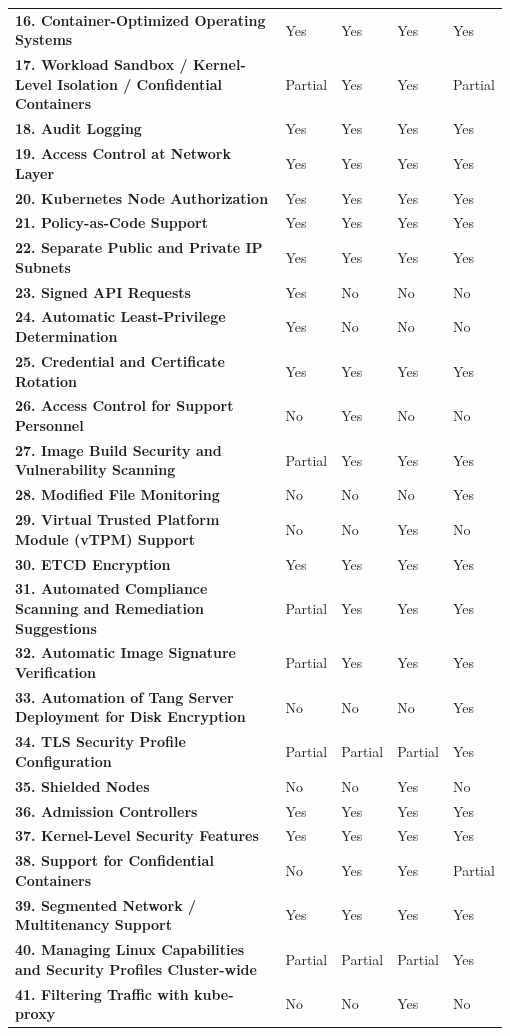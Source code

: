 \begin{longtable}{p{0.74\linewidth} p{0.06\linewidth} p{0.06\linewidth} p{0.06\linewidth} p{0.06\linewidth}}
\textbf{16. Container-Optimized Operating Systems} & Yes & Yes & Yes &
Yes \\
\textbf{17. Workload Sandbox / Kernel-Level Isolation / Confidential
Containers} & \small{Partial} & Yes & Yes & \small{Partial} \\
\textbf{18. Audit Logging} & Yes & Yes & Yes & Yes \\
\textbf{19. Access Control at Network Layer} & Yes & Yes & Yes & Yes \\
\textbf{20. Kubernetes Node Authorization} & Yes & Yes & Yes & Yes \\
\textbf{21. Policy-as-Code Support} & Yes & Yes & Yes & Yes \\
\textbf{22. Separate Public and Private IP Subnets} & Yes & Yes & Yes &
Yes \\
\textbf{23. Signed API Requests} & Yes & No & No & No \\
\textbf{24. Automatic Least-Privilege Determination} & Yes & No & No &
No \\
\textbf{25. Credential and Certificate Rotation} & Yes & Yes & Yes &
Yes \\
\textbf{26. Access Control for Support Personnel} & No & Yes & No &
No \\
\textbf{27. Image Build Security and Vulnerability Scanning} & \small{Partial} &
Yes & Yes & Yes \\
\textbf{28. Modified File Monitoring} & No & No & No & Yes \\
\textbf{29. Virtual Trusted Platform Module (vTPM) Support} & No & No &
Yes & No \\
\textbf{30. ETCD Encryption} & Yes & Yes & Yes & Yes \\
\textbf{31. Automated Compliance Scanning and Remediation Suggestions} &
\small{Partial} & Yes & Yes & Yes \\
\textbf{32. Automatic Image Signature Verification} & \small{Partial} & Yes &
Yes & Yes \\
\textbf{33. Automation of Tang Server Deployment for Disk Encryption} &
No & No & No & Yes \\
\textbf{34. TLS Security Profile Configuration} & \small{Partial} & \small{Partial} &
\small{Partial} & Yes \\
\textbf{35. Shielded Nodes} & No & No & Yes & No \\
\textbf{36. Admission Controllers} & Yes & Yes & Yes & Yes \\
\textbf{37. Kernel-Level Security Features} & Yes & Yes & Yes & Yes \\
\textbf{38. Support for Confidential Containers} & No & Yes & Yes &
\small{Partial} \\
\textbf{39. Segmented Network / Multitenancy Support} & Yes & Yes & Yes
& Yes \\
\textbf{40. Managing Linux Capabilities and Security Profiles
Cluster-wide} & \small{Partial} & \small{Partial} & \small{Partial} & Yes \\
\textbf{41. Filtering Traffic with kube-proxy} & No & No & Yes & No \\
\end{longtable}


